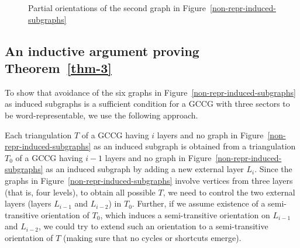 \documentclass[12pt]{article}
\numberwithin{equation}{section}
\begin{document}
\begin{figure}[!htbp]
\begin{center}
\caption{Partial orientations of the second graph in Figure~\ref{non-repr-induced-subgraphs}}\label{12-partially-orient-graphs}
\end{center}
\end{figure}

\subsection{An inductive argument proving Theorem~\ref{thm-3}}\label{inductive-arg-subsec}

To show that avoidance of the six graphs in Figure~\ref{non-repr-induced-subgraphs} as induced subgraphs is a sufficient condition for a GCCG with three sectors to be word-representable, we use the following approach.

Each triangulation $T$ of a GCCG having $i$ layers and no graph in Figure~\ref{non-repr-induced-subgraphs} as an induced subgraph is obtained from  a triangulation $T_0$ of a GCCG  having $i-1$ layers and no graph in Figure~\ref{non-repr-induced-subgraphs} as an induced subgraph by adding a new external layer $L_i$. Since the graphs in Figure~\ref{non-repr-induced-subgraphs} involve vertices from three layers (that is, four levels), to obtain all possible $T$, we need to control the two external layers (layers $L_{i-1}$ and $L_{i-2}$) in $T_0$. Further, if we assume existence of a semi-transitive orientation of $T_0$, which induces a semi-transitive orientation on  $L_{i-1}$ and $L_{i-2}$, we could try to extend such an orientation to a semi-transitive orientation of $T$ (making sure that no cycles or shortcuts emerge).
\end{document}
